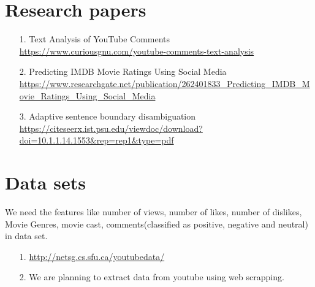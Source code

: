 \documentclass[12pt]{article}
\begin{document}
\pagebreak
\section{Research papers}

\begin{itemize}
	
	\item[1. ] Text Analysis of YouTube Comments \newline \url{https://www.curiousgnu.com/youtube-comments-text-analysis}
	
	\item[2. ] Predicting IMDB Movie Ratings Using Social Media \newline \url{https://www.researchgate.net/publication/262401833_Predicting\_IMDB\_Movie\_Ratings\_Using\_Social\_Media}
	
	\item[3. ] Adaptive sentence boundary disambiguation
	\newline \url{https://citeseerx.ist.psu.edu/viewdoc/download?doi=10.1.1.14.1553\&rep=rep1\&type=pdf}
	
\end{itemize}

\section{Data sets}
We need the features like number of views, number of likes, number of dislikes, Movie Genres, movie cast, comments(classified as positive, negative and neutral) in data set.

\begin{itemize}	
	\item[1. ] \url{http://netsg.cs.sfu.ca/youtubedata/}
	
	\item[2. ] We are planning to extract data from youtube using web scrapping.
\end{itemize}
\end{document}
